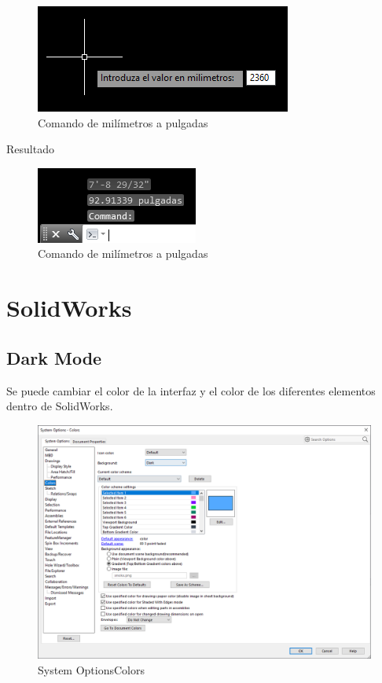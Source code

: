 \documentclass[12pt,letterpaper,final]{report}
\begin{document}
\begin{figure}[H]
	\centering
	\includegraphics[width=0.65\linewidth, height=0.5\textheight,keepaspectratio]{Imagenes/autocad_mmapulgadas_02}
	\caption{Comando de milímetros a pulgadas}
	\label{fig:autocadmmapulgadas02}
\end{figure}

{\LARGE Resultado}

\begin{figure}[H]
	\centering
	\includegraphics[width=0.65\linewidth, height=0.5\textheight,keepaspectratio]{Imagenes/autocad_mmapulgadas_03}
	\caption{Comando de milímetros a pulgadas}
	\label{fig:autocadmmapulgadas03}
\end{figure}

\part{SolidWorks}

\chapter{Dark Mode}

Se puede cambiar el color de la interfaz y el color de los diferentes elementos dentro de SolidWorks.

\begin{figure}[H]
	\centering
	\includegraphics[width=0.95\linewidth, height=0.65\textheight,keepaspectratio]{Imagenes/solidworks_dark_mode01}
	\caption{System Options\textrightarrow Colors}
	\label{fig:solidworksdarkmode01}
\end{figure}
\end{document}
